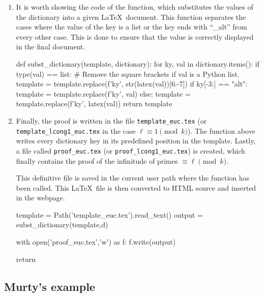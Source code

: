 \documentclass[../main.tex]{subfiles}
\begin{document}
\begin{enumerate}
	\item It is worth showing the code of the \textcolor{blue}{} function, which substitutes the values of the dictionary into a given \LaTeX \ document. This function separates the cases where the value of the key is a list or the key ends with ``\_alt'' from every other case. This is done to ensure that the value is correctly displayed in the final document.\\
	
	\begin{python}
		
	def subst_dictionary(template, dictionary):
		for ky, val in dictionary.items():
			if type(val) == list: # Remove the square brackets if val is a Python list.
				template = template.replace(f'{{{ky}}}', str(latex(val))[6:-7]) 
			if ky[-3:] == "alt":
				template = template.replace(f'{{{ky}}}', val)
			else:
				template = template.replace(f'{{{ky}}}', latex(val))
		return template
	\end{python}
	
	\item Finally, the proof is written in the file \texttt{template\_euc.tex} (or \texttt{template\_lcong1\_euc.tex} in the case $\ell\equiv 1\pmod{k}$). The function \textcolor{blue}{} above writes every dictionary key in its predefined position in the template. Lastly, a file called \texttt{proof\_euc.tex} (or  \texttt{proof\_lcong1\_euc.tex}) is created, which finally contains the proof of the infinitude of primes $\equiv\ell\pmod{k}$. 
	
 	This definitive file is saved in the current user path where the function \textcolor{blue}{} has been called. This \LaTeX \ file is then converted to HTML source and inserted in the webpage.\\
	
	\begin{python}
		
		template = Path('template_euc.tex').read_text()
		output = subst_dictionary(template,d)
		
		with open('proof_euc.tex','w') as f:
			f.write(output)
	
		return 
	\end{python}
	
\end{enumerate}

\subsection{Murty's example}\label{sec:MurtysExample}
\end{document}
